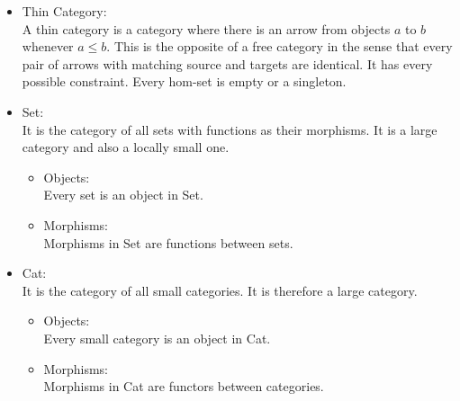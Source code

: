 \begin{itemize}
  \item Thin Category:\\
    A thin category is a category where there is an arrow from objects $a$ to
    $b$ whenever $a \leq b$. This is the opposite of a free category in the
    sense that every pair of arrows with matching source and targets are
    identical. It has every possible constraint. Every hom-set is empty or a
    singleton.

  \item Set:\\
    It is the category of all sets with functions as their morphisms.
    It is a large category and also a locally small one. \parencite{awodey:category_theory}
    \begin{itemize}
      \item Objects:\\
        Every set is an object in Set.
      \item Morphisms:\\
        Morphisms in Set are functions between sets.
    \end{itemize}

  \item Cat:\\
    It is the category of all small categories. It is therefore a large category.
    \parencite{adamek_herrlich_strecker:joy_cats}
    \begin{itemize}
      \item Objects:\\
        Every small category is an object in Cat.
      \item Morphisms:\\
        Morphisms in Cat are functors between categories.
    \end{itemize}
\end{itemize}
